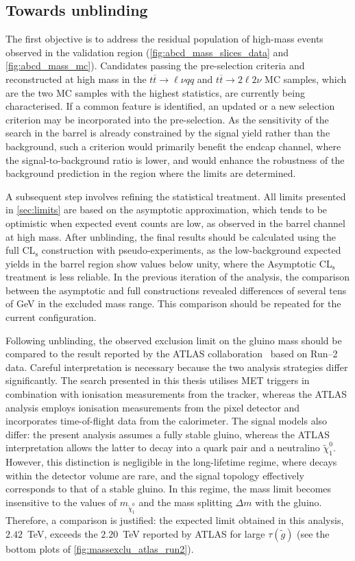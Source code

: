 \subsection{Towards unblinding}

The first objective is to address the residual population of high-mass events observed in the validation region (\cref{fig:abcd_mass_slices_data} and \cref{fig:abcd_mass_mc}). Candidates passing the pre-selection criteria and reconstructed at high mass in the $t\overline{t}\to\ell\nu qq$ and $t\overline{t}\to2\ell2\nu$ MC samples, which are the two MC samples with the highest statistics, are currently being characterised. If a common feature is identified, an updated or a new selection criterion may be incorporated into the pre-selection. As the sensitivity of the search in the barrel is already constrained by the signal yield rather than the background, such a criterion would primarily benefit the endcap channel, where the signal-to-background ratio is lower, and would enhance the robustness of the background prediction in the region where the limits are determined.

A subsequent step involves refining the statistical treatment. All limits presented in \cref{sec:limits} are based on the asymptotic approximation, which tends to be optimistic when expected event counts are low, as observed in the barrel channel at high mass. After unblinding, the final results should be calculated using the full CL$_\text{s}$ construction with pseudo-experiments, as the low-background expected yields in the barrel region show values below unity, where the Asymptotic CL$_\text{s}$ treatment is less reliable. In the previous iteration of the analysis, the comparison between the asymptotic and full constructions revealed differences of several tens of GeV in the excluded mass range. This comparison should be repeated for the current configuration.

Following unblinding, the observed exclusion limit on the gluino mass should be compared to the result reported by the ATLAS collaboration~\cite{HSCP_ATLAS_2025} based on Run--2 data. Careful interpretation is necessary because the two analysis strategies differ significantly. The search presented in this thesis utilises MET triggers in combination with ionisation measurements from the tracker, whereas the ATLAS analysis employs ionisation measurements from the pixel detector and incorporates time-of-flight data from the calorimeter. The signal models also differ: the present analysis assumes a fully stable gluino, whereas the ATLAS interpretation allows the latter to decay into a quark pair and a neutralino $\tilde{{\chi}}_1^0$. However, this distinction is negligible in the long-lifetime regime, where decays within the detector volume are rare, and the signal topology effectively corresponds to that of a stable gluino. In this regime, the mass limit becomes insensitive to the values of $m_{\tilde{\chi}_1^0}$ and the mass splitting $\Delta m$ with the gluino. Therefore, a comparison is justified: the expected limit obtained in this analysis, $2.42$~TeV, exceeds the $2.20$~TeV reported by ATLAS for large $\tau(\tilde{g})$ (see the bottom plots of \cref{fig:massexclu_atlas_run2}).



